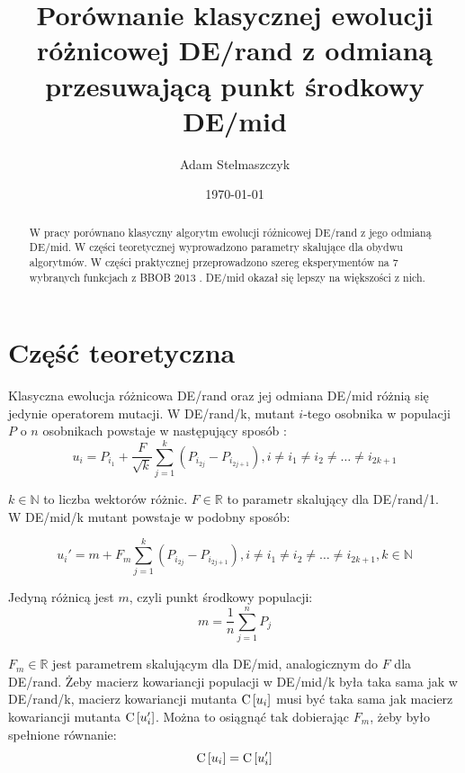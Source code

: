 \documentclass[12pt, a4paper]{article}
\title{\textbf{Porównanie klasycznej ewolucji różnicowej DE/rand z odmianą przesuwającą punkt środkowy DE/mid}}
\author{Adam Stelmaszczyk}
\date{\today}
\def\C{{\rm C}\,}
\begin{document}
\maketitle

\begin{abstract}
W pracy porównano klasyczny algorytm ewolucji różnicowej DE/rand z jego odmianą DE/mid.
W części teoretycznej wyprowadzono parametry skalujące dla obydwu algorytmów. W części praktycznej
przeprowadzono szereg eksperymentów na 7 wybranych funkcjach z BBOB 2013 \cite{hansen}. DE/mid
okazał się lepszy na większości z nich.
\end{abstract}

\section{Część teoretyczna}

Klasyczna ewolucja różnicowa DE/rand oraz jej odmiana DE/mid różnią się jedynie operatorem mutacji.
W DE/rand/k, mutant $i$-tego osobnika w populacji $P$ o $n$ osobnikach powstaje w następujący sposób \cite{opara}:
\begin{equation} \label{eq:derand}
u_i = P_{i_1} + \frac{F}{\sqrt{k}}\sum\limits_{j=1}^k (P_{i_{2j}} - P_{i_{2j+1}}),
i \neq i_1 \neq i_2 \neq \dots \neq i_{2k+1}
\end{equation}

$k \in \mathbb{N}$ to liczba wektorów różnic. $F\in\mathbb{R}$ to parametr skalujący dla DE/rand/1. \\

W DE/mid/k mutant powstaje w podobny sposób:

\begin{equation} \label{eq:demid}
u_i' = m + F_m\sum\limits_{j=1}^k (P_{i_{2j}} - P_{i_{2j+1}}), 
i \neq i_1 \neq i_2 \neq \dots \neq i_{2k+1}, k \in \mathbb{N}
\end{equation}

Jedyną różnicą jest $m$, czyli punkt środkowy populacji:
\begin{equation} \label{eq:midpoint}
m = \frac{1}{n}\sum\limits_{j=1}^n P_j
\end{equation}

$F_m\in\mathbb{R}$ jest parametrem skalującym dla DE/mid, analogicznym do $F$ dla DE/rand. 
Żeby macierz kowariancji populacji w DE/mid/k była taka sama jak w DE/rand/k, 
macierz kowariancji mutanta $\C[u_i]$ musi być taka sama jak macierz kowariancji mutanta $\C[u_i']$.
Można to osiągnąć tak dobierając $F_m$, żeby było spełnione równanie:
\begin{equation} \label{eq:rownanie}
\C[u_i] = \C[u_i']
\end{equation}
\end{document}
